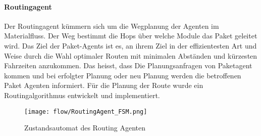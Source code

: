 \paragraph{Routingagent}
Der Routingagent kümmern sich um die Wegplanung der Agenten im Materialfluss. Der Weg bestimmt die Hops über welche Module das Paket geleitet wird.
Das Ziel der Paket-Agents ist es, an ihrem Ziel in der effizientesten Art und Weise durch die Wahl optimaler Routen 
mit minimalen Abständen und kürzesten Fahrzeiten anzukommen. Das heisst, dass Die Planungsanfragen
von Paketagent kommen und bei erfolgter Planung oder neu Planung werden die betroffenen Paket Agenten informiert. Für die Planung der 
Route wurde ein Routingalgorithmus entwickelt und implementiert.

\begin{figure}[!h]
  \centering
    \texttt{[image: flow/RoutingAgent\_FSM.png]}
    \caption{Zustandsautomat des Routing Agenten}
    \label{fig:routing_agent_fsm}
\end{figure}
